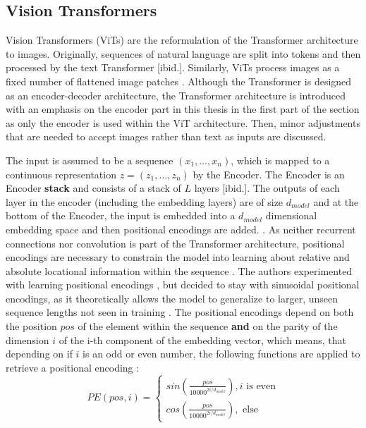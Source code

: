 \subsection{Vision Transformers}
\label{section: Vision Transformers}
Vision Transformers (ViTs) are the reformulation of the Transformer architecture \cite{Vaswani2017} to images.
Originally, sequences of natural language are split into tokens and then processed by the text Transformer [ibid.].  
Similarly, ViTs process images as a fixed number of flattened image patches \citep{Dosovitskiy2020}.
Although the Transformer is designed as an encoder-decoder architecture, the Transformer architecture is introduced with an emphasis on the encoder part in this thesis in the first part of the section as only the encoder is used within the ViT architecture.
Then, minor adjustments that are needed to accept images rather than text as inputs are discussed.
\par
The input is assumed to be a sequence $(x_1,\dots,x_n)$, which is mapped to a continuous representation $z=(z_1,\dots,z_n)$ by the Encoder\citep{Vaswani2017}.
The Encoder is an Encoder \textbf{stack} and consists of a stack of $L$ layers [ibid.].
The outputs of each layer in the encoder (including the embedding layers) are of size $d_{model}$ and at the bottom of the Encoder, the input is embedded into a $d_{model}$ dimensional embedding space and then positional encodings are added. \citep{Vaswani2017}.
As neither recurrent connections nor convolution is part of the Transformer architecture, positional encodings are necessary to constrain the model into learning about relative and absolute locational information within the sequence \citep{Vaswani2017}.
The authors experimented with learning positional encodings \citep{Gehring2018}, but decided to stay with sinusoidal positional encodings, as it theoretically allows the model to generalize to larger, unseen sequence lengths not seen in training \citep{Vaswani2017}.
The positional encodings depend on both the position $pos$ of the element within the sequence \textbf{and} on the parity of the dimension $i$ of the i-th component of the embedding vector, which means, that depending on if $i$ is an odd or even number, the following functions are applied to retrieve a positional encoding \citep{Vaswani2017}:
\begin{equation}
	PE(pos, i) = 
	\begin{cases}
		sin(\frac{pos}{10000^{2i / d_{model}}}), i \text{ is even} \\
		cos(\frac{pos}{10000^{2i / d_{model}}}), \text{ else}
	\end{cases}
	\label{equation:positional-encoding}
\end{equation}
